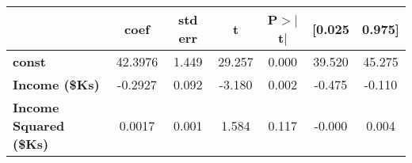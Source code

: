\begin{center}
\begin{tabular}{lcccccc}
\toprule
                               & \textbf{coef} & \textbf{std err} & \textbf{t} & \textbf{P$> |$t$|$} & \textbf{[0.025} & \textbf{0.975]}  \\
\midrule
\textbf{const}                 &      42.3976  &        1.449     &    29.257  &         0.000        &       39.520    &       45.275     \\
\textbf{Income (\$Ks)}         &      -0.2927  &        0.092     &    -3.180  &         0.002        &       -0.475    &       -0.110     \\
\textbf{Income Squared (\$Ks)} &       0.0017  &        0.001     &     1.584  &         0.117        &       -0.000    &        0.004     \\
\bottomrule
\end{tabular}
\end{center}